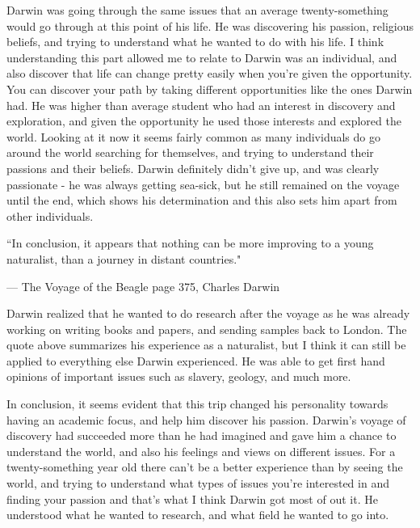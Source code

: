 \documentclass[11pt, oneside]{article}
\begin{document}

\par Darwin was going through the same issues that an average twenty-something would go through at this point of his life. He was discovering his passion, religious beliefs, and trying to understand what he wanted to do with his life. I think understanding this part allowed me to relate to Darwin was an individual, and also discover that life can change pretty easily when you're given the opportunity. You can discover your path by taking different opportunities like the ones Darwin had. He was higher than average student who had an interest in discovery and exploration, and given the opportunity he used those interests and explored the world. Looking at it now it seems fairly common as many individuals do go around the world searching for themselves, and trying to understand their passions and their beliefs. Darwin definitely didn't give up, and was clearly passionate - he was always getting sea-sick, but he still remained on the voyage until the end, which shows his determination and this also sets him apart from other individuals. 

\epigraph{``In conclusion, it appears that nothing can be more improving to a young naturalist, than a journey in distant countries."}{--- \textup{The Voyage of the Beagle page 375, Charles Darwin}}

\par Darwin realized that he wanted to do research after the voyage as he was already working on writing books and papers, and sending samples back to London. The quote above summarizes his experience as a naturalist, but I think it can still be applied to everything else Darwin experienced. He was able to get first hand opinions of important issues such as slavery, geology, and much more.

\par In conclusion, it seems evident that this trip changed his personality towards having an academic focus, and help him discover his passion. Darwin's voyage of discovery had succeeded more than he had imagined and gave him a chance to understand the world, and also his feelings and views on different issues. For a twenty-something year old there can't be a better experience than by seeing the world, and trying to understand what types of issues you're interested in and finding your passion and that's what I think Darwin got most of out it. He understood what he wanted to research, and what field he wanted to go into. 
\end{document}
